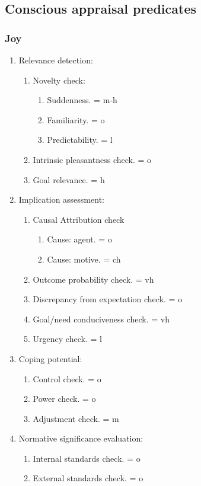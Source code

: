 \subsection{Conscious appraisal predicates}

\subsubsection{Joy}

\begin{enumerate}
 \item  Relevance detection:
 \begin{enumerate}
  \item  Novelty check:
  \begin{enumerate}
   \item  Suddenness. = m-h
   \item  Familiarity. = o
   \item  Predictability. = l
  \end{enumerate}
  \item  Intrinsic pleasantness check. = o
  \item  Goal relevance. = h
 \end{enumerate}
 \item  Implication assessment:
 \begin{enumerate}
  \item  Causal Attribution check
  \begin{enumerate}
   \item  Cause: agent. = o
   \item  Cause: motive. = ch
  \end{enumerate}
  \item  Outcome probability check. = vh
  \item  Discrepancy from expectation check. = o
  \item  Goal/need conduciveness check. = vh
  \item  Urgency check. = l
 \end{enumerate}
 \item  Coping potential:
 \begin{enumerate}
  \item  Control check. = o
  \item  Power check. = o
  \item  Adjustment check. = m
 \end{enumerate}
 \item  Normative significance evaluation:
 \begin{enumerate}
  \item  Internal standards check. = o
  \item  External standards check. = o
 \end{enumerate}
\end{enumerate}

